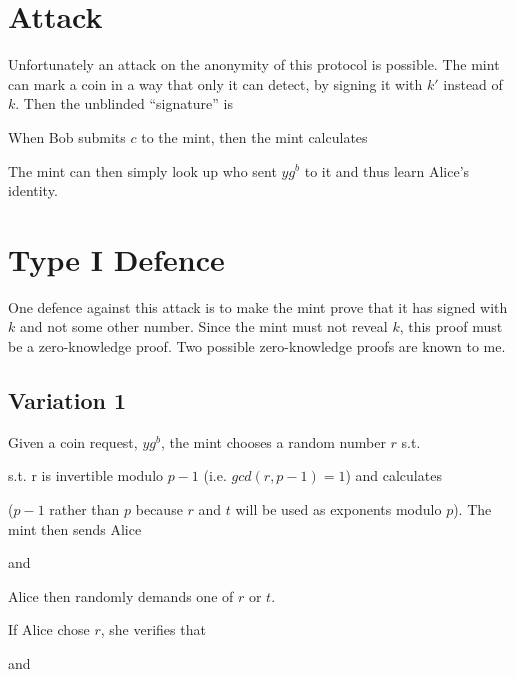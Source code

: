 \documentclass[a4paper,titlepage]{article}
\begin{document}
\section{Attack\cite{Anon1}}

Unfortunately an attack on the anonymity of this protocol is
possible. The mint can mark a coin in a way that only it can detect,
by signing it with $k'$ instead of $k$. Then the unblinded
``signature'' is


When Bob submits $c$ to the mint, then the mint calculates


The mint can then simply look up who sent $y g^b$ to it and thus learn
Alice's identity.

\section{Type I Defence}

One defence against this attack is to make the mint prove that it has
signed with $k$ and not some other number. Since the mint must not
reveal $k$, this proof must be a zero-knowledge proof. Two possible
zero-knowledge proofs are known to me.

\subsection{Variation 1\cite{Goldberg2}}

Given a coin request, $y g^b$, the mint chooses a random number $r$
 s.t.

\qe{r \in [1,p-1)}

s.t. r is invertible modulo $p-1$ (i.e. $gcd(r,p-1)=1$) and calculates


($p-1$ rather than $p$ because $r$ and $t$ will be used as exponents
modulo $p$). The mint then sends Alice


and


Alice then randomly demands one of $r$ or $t$.

If Alice chose $r$, she verifies that


and
\end{document}
